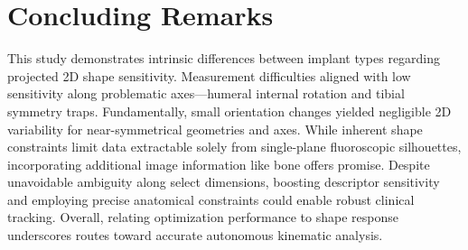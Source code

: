 \section{Concluding Remarks}
This study demonstrates intrinsic differences between implant types regarding projected 2D shape sensitivity.
Measurement difficulties aligned with low sensitivity along problematic axes—humeral internal rotation and tibial symmetry traps.
Fundamentally, small orientation changes yielded negligible 2D variability for near-symmetrical geometries and axes.
While inherent shape constraints limit data extractable solely from single-plane fluoroscopic silhouettes, incorporating additional image information like bone offers promise.
Despite unavoidable ambiguity along select dimensions, boosting descriptor sensitivity and employing precise anatomical constraints could enable robust clinical tracking.
Overall, relating optimization performance to shape response underscores routes toward accurate autonomous kinematic analysis.


